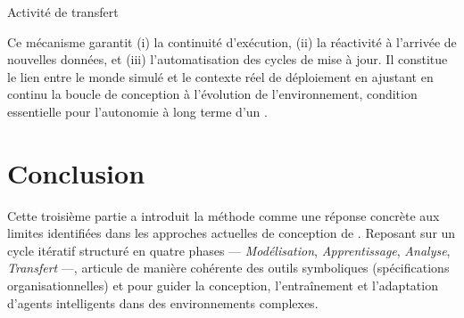 \vspace{-0.3em}
\begin{algorithm}[H]
    \caption{Activité de transfert}
    \label{alg:transferring}
    \DontPrintSemicolon

    \vspace{0.3em}
\end{algorithm}

Ce mécanisme garantit (i) la continuité d'exécution, (ii) la réactivité à l'arrivée de nouvelles données, et (iii) l'automatisation des cycles de mise à jour. Il constitue le lien entre le monde simulé et le contexte réel de déploiement en ajustant en continu la boucle de conception à l'évolution de l'environnement, condition essentielle pour l'autonomie à long terme d'un .



\chapter*{Conclusion}

\noindent
Cette troisième partie a introduit la méthode \textbf{} comme une réponse concrète aux limites identifiées dans les approches actuelles de conception de . Reposant sur un cycle itératif structuré en quatre phases — \textit{Modélisation}, \textit{Apprentissage}, \textit{Analyse}, \textit{Transfert} —,  articule de manière cohérente des outils symboliques (spécifications organisationnelles) et  pour guider la conception, l'entraînement et l'adaptation d'agents intelligents dans des environnements complexes.

